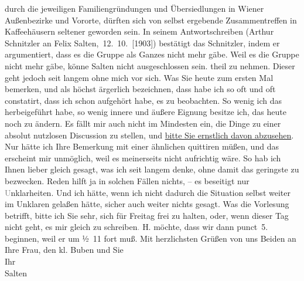 \begin{ledgroupsized}[t]{13cm}
{{{                  durch die jeweiligen Familiengründungen und Übersiedlungen in Wiener Außenbezirke und Vororte, dürften sich von selbst 
                     ergebende Zusammentreffen in Kaffeehäusern seltener geworden sein. In seinem
                  Antwortschreiben (Arthur Schnitzler an Felix Salten, 12. 10. [1903]) bestätigt das
                     Schnitzler, indem er argumentiert, dass
                  es die Gruppe als Ganzes nicht mehr gäbe. Weil es die Gruppe nicht mehr gäbe, könne Salten nicht ausgeschlossen sein. }}}\label{K_L03347-2h} theil zu
               nehmen. Dieser geht jedoch seit langem ohne mich vor sich. Was Sie heute zum ersten Mal bemerken, und als höchst ärgerlich
               bezeichnen, dass habe ich so oft und oft constatirt, dass ich schon aufgehört habe,
               es zu beobachten. So wenig ich das herbeigeführt habe, so wenig innere und äußere
               Eignung besitze ich, das heute noch zu ändern. Es fällt mir auch nicht im Mindesten
               ein, die Dinge zu einer absolut nutzlosen Discussion zu stellen, und \uline{bitte Sie ernstlich davon abzusehen}. Nur hätte ich
               Ihre Bemerkung mit einer ähnlichen quittiren müßen, und das erscheint mir unmöglich,
               weil es meinerseits nicht aufrichtig wäre. So hab ich Ihnen lieber gleich gesagt, was
               ich seit langem denke, ohne damit das geringste zu bezwecken. Reden hilft ja in
               solchen Fällen nichts, – es beseitigt nur \textcolor{gray}{U}nklarheiten. Und ich
               hätte, wenn ich nicht dadurch die Situation selbst weiter im Unklaren gelaßen hätte,
               sicher auch weiter nichts gesagt.\pend
           \pstart
           {\pb}Was die Vorlesung betrifft,
               bitte ich Sie sehr, sich für Freitag frei zu halten,
               oder, wenn dieser Tag nicht geht, es mir gleich zu schreiben\textcolor{gray}{.}{ }H. möchte, dass wir dann punct 5.
               beginnen, weil er um ½ 11 fort muß.\pend
           \pstart
           Mit herzlichsten Grüßen von uns Beiden an Ihre Frau,
               den kl. Buben und Sie
               {\\}Ihr {\\}\spacefill\mbox{Salten}\pend
           

\end{ledgroupsized}
